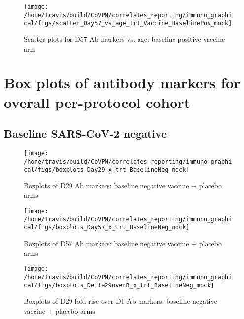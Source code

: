 \documentclass[]{book}
\theoremstyle{definition}
\theoremstyle{definition}
\theoremstyle{definition}
\newcommand{\1}{\mathbbm{1}}
\begin{document}
\clearpage
\begin{figure}[H]

{\centering \texttt{[image: /home/travis/build/CoVPN/correlates\_reporting/immuno\_graphical/figs/scatter\_Day57\_vs\_age\_trt\_Vaccine\_BaselinePos\_mock]} 

}

\caption{Scatter plots for D57 Ab markers vs. age: baseline positive vaccine arm}\label{fig:unnamed-chunk-36}
\end{figure}

\clearpage

\hypertarget{box-plots-of-antibody-markers-for-overall-per-protocol-cohort}{%
\section{Box plots of antibody markers for overall per-protocol cohort}\label{box-plots-of-antibody-markers-for-overall-per-protocol-cohort}}

\hypertarget{baseline-sars-cov-2-negative-2}{%
\subsection{Baseline SARS-CoV-2 negative}\label{baseline-sars-cov-2-negative-2}}

\begin{figure}[H]

{\centering \texttt{[image: /home/travis/build/CoVPN/correlates\_reporting/immuno\_graphical/figs/boxplots\_Day29\_x\_trt\_BaselineNeg\_mock]} 

}

\caption{Boxplots of D29 Ab markers: baseline negative vaccine + placebo arms}\label{fig:unnamed-chunk-37}
\end{figure}

\clearpage
\begin{figure}[H]

{\centering \texttt{[image: /home/travis/build/CoVPN/correlates\_reporting/immuno\_graphical/figs/boxplots\_Day57\_x\_trt\_BaselineNeg\_mock]} 

}

\caption{Boxplots of D57 Ab markers: baseline negative vaccine + placebo arms}\label{fig:unnamed-chunk-38}
\end{figure}

\clearpage
\begin{figure}[H]

{\centering \texttt{[image: /home/travis/build/CoVPN/correlates\_reporting/immuno\_graphical/figs/boxplots\_Delta29overB\_x\_trt\_BaselineNeg\_mock]} 

}

\caption{Boxplots of D29 fold-rise over D1 Ab markers: baseline negative vaccine + placebo arms}\label{fig:unnamed-chunk-39}
\end{figure}
\end{document}
